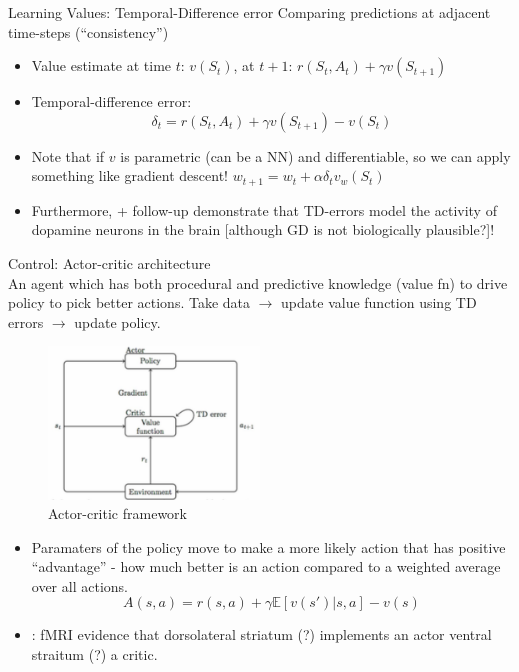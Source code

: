 \documentclass[12pt]{article}
\begin{document}
Learning Values: Temporal-Difference error
Comparing predictions at adjacent time-steps (``consistency'')
\begin{itemize}
    \item Value estimate at time $t$: $v(S_t)$, at $t+1$: $r(S_t, A_t) + \gamma v(S_{t+1})$
    \item Temporal-difference error: $$\delta_t = r(S_t, A_t) + \gamma v(S_{t+1}) - v(S_t)$$
    \item Note that if $v$ is parametric (can be a NN) and differentiable, so we can apply something like gradient descent! $w_{t+1} = w_t + \alpha \delta_tv_w(S_t)$
    \item Furthermore, \cite{schultz97} + follow-up demonstrate that TD-errors model the activity of dopamine neurons in the brain [although GD is not biologically plausible?]!
\end{itemize}

Control: Actor-critic architecture \\

An agent which has both procedural and predictive knowledge (value fn) to drive policy to pick better actions. Take data $\rightarrow$ update value function using TD errors $\rightarrow$ update policy. 
\begin{figure}
  \centering
      \includegraphics[width=0.5\textwidth]{images/aca.png}
  \caption{Actor-critic framework}
\end{figure}
\begin{itemize}
    \item Paramaters of the policy move to make a more likely action that has positive ``advantage'' - how much better is an action compared to a weighted average over all actions. $$A(s,a) = r(s,a) + \gamma \mathbb{E}[v(s') | s,a] - v(s)$$
    \item \cite{ODoherty04}: fMRI evidence that dorsolateral striatum (?) implements an actor ventral straitum (?) a critic.
\end{itemize}
\end{document}
